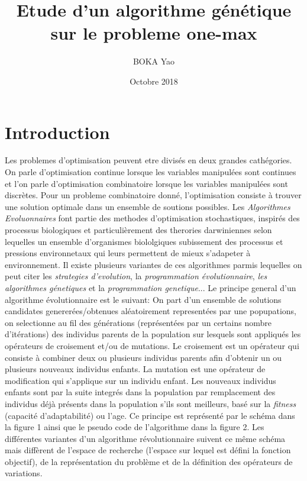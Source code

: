 \documentclass{article}
\title{Etude d'un algorithme génétique sur le probleme one-max}
\author{BOKA Yao }
\date{Octobre 2018}
\begin{document}
\maketitle

\section{Introduction}

Les problemes d'optimisation peuvent etre divisés en deux grandes cathégories. On parle d'optimisation continue lorsque les variables manipulées sont continues et l'on parle d'optimisation combinatoire lorsque les variables manipulées sont discrètes.
Pour un probleme combinatoire donné, l'optimisation consiste à trouver une solution optimale dans un  ensemble de soutions possibles.
Les \emph{Algorithmes Evoluonnaires} font partie des methodes d'optimisation stochastiques, inspirés des processus biologiques et particulièrement des therories darwiniennes  selon lequelles un ensemble d'organismes biololgiques subissement des processus et pressions environnetaux qui leurs permettent de mieux s'adapeter à environnement. Il existe plusieurs variantes de ces algorithmes parmis lequelles on peut citer les \emph{strategies d'evolution}, la \emph{programmation évolutionnaire}, \emph{les algorithmes génetiques} et la \emph{programmation genetique}...
Le principe general d'un algorithme évolutionnaire est le suivant: On part d'un ensemble de solutions candidates genererées/obtenues aléatoirement representées par une popupations, on selectionne au fil des générations (représentées par un certains nombre d'itérations) des individus parents de la population sur lesquels sont appliqués les opérateurs de croisement et/ou de mutations. Le croisement est un opérateur qui consiste à combiner deux ou plusieurs individus parents afin d'obtenir un ou plusieurs nouveaux individus enfants. La mutation est une opérateur de modification qui s'applique sur un individu enfant. Les nouveaux individus enfants sont par la suite integrés dans la population par remplacement des individus déjà présents dans la population s'ils sont meilleurs, basé sur la \emph{fitness} (capacité d'adaptabilité) ou l'age.  Ce principe est représenté par le schéma dans la figure 1 ainsi que le pseudo code de l'algorithme dans la figure 2.
Les différentes variantes d'un algorithme révolutionnaire suivent ce même schéma mais diffèrent de l'espace de recherche (l'espace sur lequel est défini la fonction objectif), de la représentation du problème et de la définition des opérateurs de variations.
\end{document}
